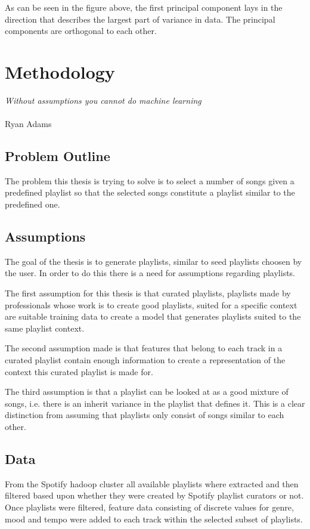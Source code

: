 \documentclass[a4paper,11pt]{kth-mag}
\begin{document}
As can be seen in the figure above, the first principal component lays in the direction that describes the largest part of variance in data. The principal components are orthogonal to each other. 

\chapter{Methodology}
\begin{displayquote}
\textit{Without assumptions you cannot do machine learning} \\\\Ryan Adams
\end{displayquote}

\section{Problem Outline}
The problem this thesis is trying to solve is to select a number of songs given a predefined playlist so that the selected songs constitute a playlist similar to the predefined one. 

\section{Assumptions}


The goal of the thesis is to generate playlists, similar to seed playlists choosen by the user. In order to do this there is a need for assumptions regarding playlists.

The first assumption for this thesis is that curated playlists, playlists made by professionals whose work is to create good playlists, suited for a specific context are suitable training data to create a model that generates playlists suited to the same playlist context.

The second assumption made is that features that belong to each track in a curated playlist contain enough information to create a representation of the context this curated playlist is made for.

The third assumption is that a playlist can be looked at as a good mixture of songs, i.e. there is an inherit variance in the playlist that defines it. This is a clear distinction from assuming that playlists only consist of songs similar to each other.


\section{Data}
From the Spotify hadoop cluster all available playlists where extracted and then filtered based upon whether they were created by Spotify playlist curators or not. Once playlists were filtered, feature data consisting of discrete values for genre, mood and tempo were added to each track within the selected subset of playlists.
\end{document}
